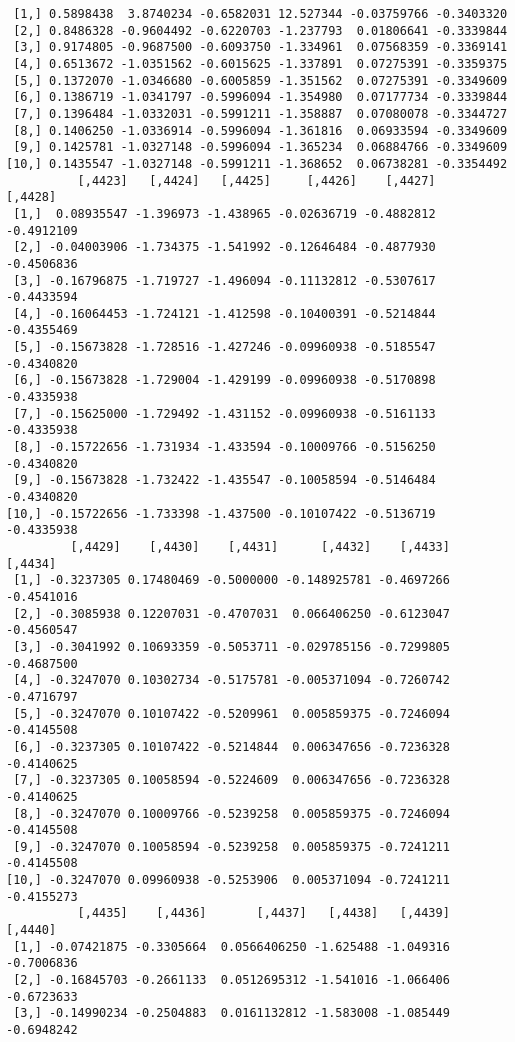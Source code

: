 \documentclass[
  letterpaper,
  DIV=11,
  numbers=noendperiod]{scrreprt}
\begin{document}
\begin{verbatim}
 [1,] 0.5898438  3.8740234 -0.6582031 12.527344 -0.03759766 -0.3403320
 [2,] 0.8486328 -0.9604492 -0.6220703 -1.237793  0.01806641 -0.3339844
 [3,] 0.9174805 -0.9687500 -0.6093750 -1.334961  0.07568359 -0.3369141
 [4,] 0.6513672 -1.0351562 -0.6015625 -1.337891  0.07275391 -0.3359375
 [5,] 0.1372070 -1.0346680 -0.6005859 -1.351562  0.07275391 -0.3349609
 [6,] 0.1386719 -1.0341797 -0.5996094 -1.354980  0.07177734 -0.3339844
 [7,] 0.1396484 -1.0332031 -0.5991211 -1.358887  0.07080078 -0.3344727
 [8,] 0.1406250 -1.0336914 -0.5996094 -1.361816  0.06933594 -0.3349609
 [9,] 0.1425781 -1.0327148 -0.5996094 -1.365234  0.06884766 -0.3349609
[10,] 0.1435547 -1.0327148 -0.5991211 -1.368652  0.06738281 -0.3354492
          [,4423]   [,4424]   [,4425]     [,4426]    [,4427]    [,4428]
 [1,]  0.08935547 -1.396973 -1.438965 -0.02636719 -0.4882812 -0.4912109
 [2,] -0.04003906 -1.734375 -1.541992 -0.12646484 -0.4877930 -0.4506836
 [3,] -0.16796875 -1.719727 -1.496094 -0.11132812 -0.5307617 -0.4433594
 [4,] -0.16064453 -1.724121 -1.412598 -0.10400391 -0.5214844 -0.4355469
 [5,] -0.15673828 -1.728516 -1.427246 -0.09960938 -0.5185547 -0.4340820
 [6,] -0.15673828 -1.729004 -1.429199 -0.09960938 -0.5170898 -0.4335938
 [7,] -0.15625000 -1.729492 -1.431152 -0.09960938 -0.5161133 -0.4335938
 [8,] -0.15722656 -1.731934 -1.433594 -0.10009766 -0.5156250 -0.4340820
 [9,] -0.15673828 -1.732422 -1.435547 -0.10058594 -0.5146484 -0.4340820
[10,] -0.15722656 -1.733398 -1.437500 -0.10107422 -0.5136719 -0.4335938
         [,4429]    [,4430]    [,4431]      [,4432]    [,4433]    [,4434]
 [1,] -0.3237305 0.17480469 -0.5000000 -0.148925781 -0.4697266 -0.4541016
 [2,] -0.3085938 0.12207031 -0.4707031  0.066406250 -0.6123047 -0.4560547
 [3,] -0.3041992 0.10693359 -0.5053711 -0.029785156 -0.7299805 -0.4687500
 [4,] -0.3247070 0.10302734 -0.5175781 -0.005371094 -0.7260742 -0.4716797
 [5,] -0.3247070 0.10107422 -0.5209961  0.005859375 -0.7246094 -0.4145508
 [6,] -0.3237305 0.10107422 -0.5214844  0.006347656 -0.7236328 -0.4140625
 [7,] -0.3237305 0.10058594 -0.5224609  0.006347656 -0.7236328 -0.4140625
 [8,] -0.3247070 0.10009766 -0.5239258  0.005859375 -0.7246094 -0.4145508
 [9,] -0.3247070 0.10058594 -0.5239258  0.005859375 -0.7241211 -0.4145508
[10,] -0.3247070 0.09960938 -0.5253906  0.005371094 -0.7241211 -0.4155273
          [,4435]    [,4436]       [,4437]   [,4438]   [,4439]    [,4440]
 [1,] -0.07421875 -0.3305664  0.0566406250 -1.625488 -1.049316 -0.7006836
 [2,] -0.16845703 -0.2661133  0.0512695312 -1.541016 -1.066406 -0.6723633
 [3,] -0.14990234 -0.2504883  0.0161132812 -1.583008 -1.085449 -0.6948242

\end{verbatim}
\end{document}
